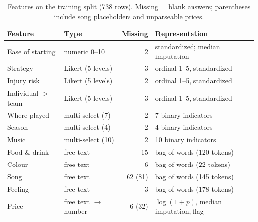 \documentclass[11pt,letterpaper]{article}
\begin{document}
\begin{table}[h]
\centering\footnotesize
\begin{tabular}{@{}llrl@{}}
\toprule
Feature & Type & Missing & Representation\\
\midrule
Ease of starting    & numeric 0--10         & 2       & standardized; median imputation      \\
Strategy            & Likert (5 levels)     & 3       & ordinal 1--5, standardized           \\
Injury risk         & Likert (5 levels)     & 2       & ordinal 1--5, standardized           \\
Individual $>$ team & Likert (5 levels)     & 3       & ordinal 1--5, standardized           \\
Where played        & multi-select (7)      & 2       & 7 binary indicators                  \\
Season              & multi-select (4)      & 2       & 4 binary indicators                  \\
Music               & multi-select (10)     & 2       & 10 binary indicators                 \\
Food \& drink       & free text             & 15      & bag of words (120 tokens)            \\
Colour              & free text             & 6       & bag of words (22 tokens)             \\
Song                & free text             & 62 (81) & bag of words (145 tokens)            \\
Feeling             & free text             & 3       & bag of words (178 tokens)            \\
Price               & free text $\to$ number & 6 (32) & $\log(1+p)$, median imputation, flag \\
\bottomrule
\end{tabular}
\caption{Features on the training split (738 rows). Missing = blank answers;
parentheses include song placeholders and unparseable prices.}
\label{tab:features}
\end{table}
\end{document}
